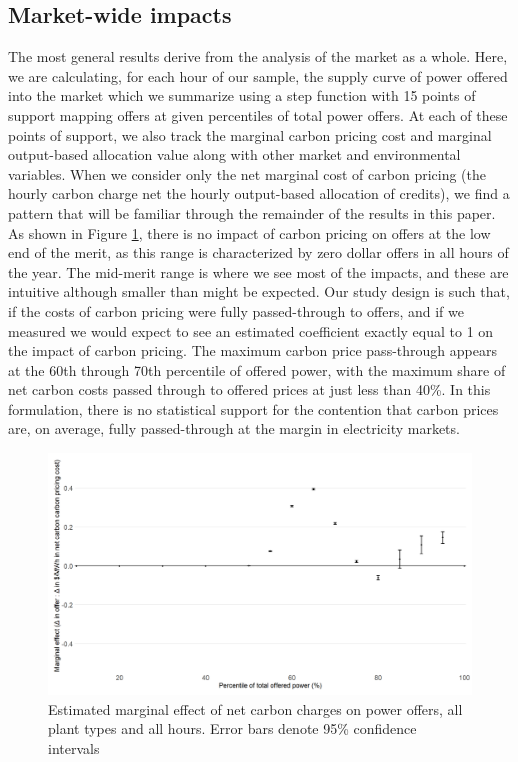 \documentclass[12pt]{article}
\begin{document}
\subsection{Market-wide impacts}
The most general results derive from the analysis of the market as a whole. Here, we are calculating, for each hour of our sample, the supply curve of power offered into the market which we summarize using a step function with 15 points of support mapping offers at given percentiles of total power offers. At each of these points of support, we also track the marginal carbon pricing cost and marginal output-based allocation value along with other market and environmental variables. When we consider only the net marginal cost of carbon pricing (the hourly carbon charge net the hourly output-based allocation of credits), we find a pattern that will be familiar through the remainder of the results in this paper. As shown in Figure \ref{fig:net_all}, there is no impact of carbon pricing on offers at the low end of the merit, as this range is characterized by zero dollar offers in all hours of the year. The mid-merit range is where we see most of the impacts, and these are intuitive although smaller than might be expected. Our study design is such that, if the costs of carbon pricing were fully passed-through to offers, and if we measured we would expect to see an estimated coefficient exactly equal to 1 on the impact of carbon pricing. The maximum carbon price pass-through appears at the 60th through 70th percentile of offered power, with the maximum share of net carbon costs passed through to offered prices at just less than 40\%. In this formulation, there is no statistical support for the contention that carbon prices are, on average, fully passed-through at the margin in electricity markets.

\begin{figure}[t]
    \centering
     \includegraphics[width=.9\textwidth]{../images/all_plants_net.png}
    \caption{Estimated marginal effect of net carbon charges on power offers, all plant types and all hours. Error bars denote 95\% confidence intervals}
    \label{fig:net_all}
\end{figure}
\end{document}
